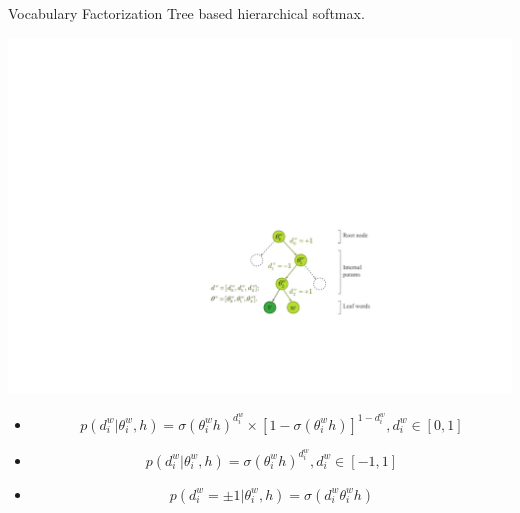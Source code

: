 \documentclass[english]{beamer} %
\begin{document}
\begin{frame}[<+->]{Vocabulary Factorization}
Tree based hierarchical softmax.
\begin{center}
    \includegraphics[scale=0.7]{thsm}
  \end{center}
\begin{itemize}
\item \begin{equation}
p(d^w_i|\theta_{i}^w,h) =\sigma(\theta_{i}^w h)^{d_i^w}\times[1-\sigma(\theta_{i}^w h)]^{1-{d_i^w}},d_i^w \in [0,1]
\end{equation}
  \item \begin{equation}
p(d^w_i|\theta_{i}^w,h) =\sigma(\theta_{i}^w h)^{d_i^w}, d_i^w \in [-1,1]
\end{equation}
  \item \begin{equation}
p(d^w_i=\pm 1|\theta_{i}^w,h) = \sigma({d_i^w}\theta_{i}^w h)
\end{equation}
\end{itemize}
\end{frame}
\end{document}
